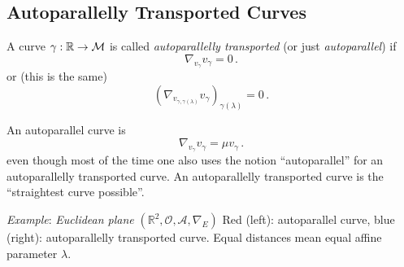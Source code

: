 \documentclass[11pt, a4paper, twocolumn]{article} %
\begin{document}
\subsection{Autoparallelly Transported Curves}
\begin{defn}
    A curve $\gamma: \mathbb{R} \to \mathcal{M}$ is called \textit{autoparallelly transported} (or just \textit{autoparallel}) if
    \begin{equation}
        \nabla_{v_\gamma} v_\gamma = 0\,.
    \end{equation}
    or (this is the same)
    \begin{equation}
        \left( \nabla_{v_{\gamma, \gamma(\lambda)}} v_\gamma \right)_{\gamma(\lambda)} = 0\,.
    \end{equation}
\end{defn}
\begin{note}
    An autoparallel curve is
    \begin{equation}
        \nabla_{v_\gamma} v_\gamma = \mu v_\gamma\,.
    \end{equation}
    even though most of the time one also uses the notion ``autoparallel'' for an autoparallelly transported curve.
    An autoparallelly transported curve is the ``straightest curve possible''.
\end{note}
\textit{Example}: \textit{Euclidean plane} $(\mathbb{R}^2, \mathcal{O}, \mathcal{A}, \nabla_E)$
Red (left): autoparallel curve, blue (right): autoparallelly transported curve.
Equal distances mean equal affine parameter $\lambda$.
\begin{center}
\end{center}
\end{document}
